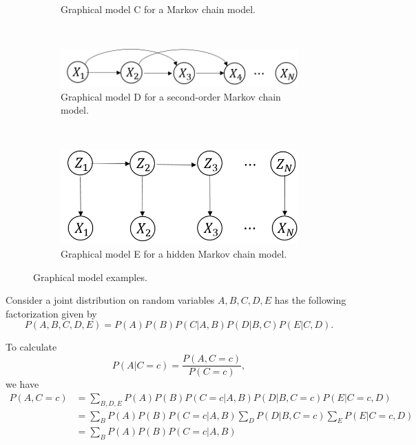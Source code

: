 \begin{refsection}
\begin{figure}[H]
\begin{subfigure}[b]{0.4\textwidth}
			\caption{Graphical model C for a Markov chain model.}
		\end{subfigure}\\
		\begin{subfigure}[b]{0.5\textwidth}
			\includegraphics[width=\textwidth]{../figures/statisticalModeling/graphModelExample4}
			\caption{Graphical model D for a second-order Markov chain model.}
		\end{subfigure}\\
		\begin{subfigure}[b]{0.45\textwidth}
			\includegraphics[width=\textwidth]{../figures/statisticalModeling/graphModelExample5}
			\caption{Graphical model E for a hidden Markov chain model.}
		\end{subfigure}
	\caption{Graphical model examples.}
	\label{ch:statistical-models:fig:graphModelExamples}
\end{figure}


\begin{example}
Consider a joint distribution on random variables $A,B,C,D,E$ has the following factorization given by
	$$P(A,B,C,D,E) = P(A)P(B)P(C|A,B)P(D|B,C)P(E|C,D).$$

To calculate $$P(A|C=c) = \frac{P(A,C=c)}{P(C=c)},$$
we have
\begin{align*}
P(A,C=c) &= \sum_{B,D,E} P(A)P(B)P(C=c|A,B)P(D|B,C=c)P(E|C=c,D) \\
&=\sum_{B} P(A)P(B)P(C=c|A,B)\sum_{D}P(D|B,C=c)\sum_{E}P(E|C=c,D) \\
&=\sum_{B} P(A)P(B)P(C=c|A,B) 
\end{align*}		
	
\end{example}


\end{refsection}
